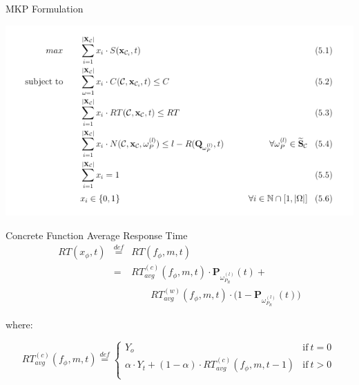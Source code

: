 \documentclass[13.5pt]{beamer}
\newcommand{\mathDef}{\overset{\textit{def}}{=}}
\begin{document}
\begin{frame}[noframenumbering]{MKP Formulation}
	
	\begin{center}
		\includegraphics[width=\textwidth,height=0.80\textheight]{../Images/super3.png}
	\end{center}
	
\end{frame} 


\begin{frame}[noframenumbering]
	
	\begin{block}{Concrete Function Average Response Time}
		\begin{eqnarray}
			RT(x_{\phi},t) & \mathDef & RT(f_{\phi},m,t) \nonumber \\
			& = & RT_{avg}^{(c)}(f_{\phi}, m,t) \cdot \textbf{P}_{\omega_{P_R}^{(l)}}(t) + \\ 
			& & \qquad RT_{avg}^{(w)}(f_{\phi}, m,t) \cdot \Big( 1 - \textbf{P}_{\omega_{P_R}^{(l)}}(t)  \Big) \nonumber
		\end{eqnarray}
	\end{block}
	
	where:
	
	\begin{equation}
		RT_{avg}^{(c)}(f_{\phi}, m,t) \mathDef
		\begin{cases}
			Y_o & \text{if}\ t = 0\\ 
			\alpha \cdot Y_t + (1 - \alpha) \cdot RT_{avg}^{(c)}(f_{\phi}, m,t-1) & \text{if}\ t > 0\\
			
		\end{cases}\,
	\end{equation}
	
\end{frame} 
\end{document}
